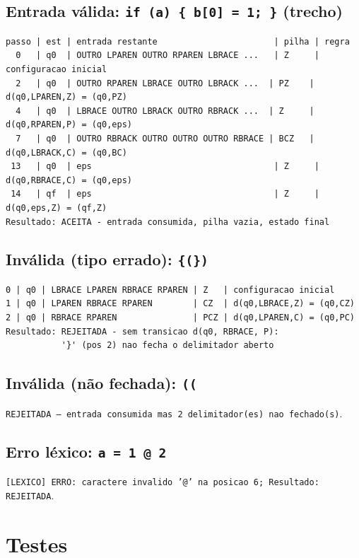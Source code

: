 \documentclass[12pt,a4paper]{article}
\begin{document}
\subsection*{Entrada válida: \texttt{if (a) \{ b[0] = 1; \}} (trecho)}
\begin{Verbatim}[fontsize=\scriptsize]
passo | est | entrada restante                       | pilha | regra
  0   | q0  | OUTRO LPAREN OUTRO RPAREN LBRACE ...   | Z     | configuracao inicial
  2   | q0  | OUTRO RPAREN LBRACE OUTRO LBRACK ...  | PZ    | d(q0,LPAREN,Z) = (q0,PZ)
  4   | q0  | LBRACE OUTRO LBRACK OUTRO RBRACK ...  | Z     | d(q0,RPAREN,P) = (q0,eps)
  7   | q0  | OUTRO RBRACK OUTRO OUTRO OUTRO RBRACE | BCZ   | d(q0,LBRACK,C) = (q0,BC)
 13   | q0  | eps                                    | Z     | d(q0,RBRACE,C) = (q0,eps)
 14   | qf  | eps                                    | Z     | d(q0,eps,Z) = (qf,Z)
Resultado: ACEITA - entrada consumida, pilha vazia, estado final
\end{Verbatim}

\subsection*{Inválida (tipo errado): \texttt{\{(\})}}
\begin{Verbatim}[fontsize=\scriptsize]
0 | q0 | LBRACE LPAREN RBRACE RPAREN | Z   | configuracao inicial
1 | q0 | LPAREN RBRACE RPAREN        | CZ  | d(q0,LBRACE,Z) = (q0,CZ)
2 | q0 | RBRACE RPAREN               | PCZ | d(q0,LPAREN,C) = (q0,PC)
Resultado: REJEITADA - sem transicao d(q0, RBRACE, P):
           '}' (pos 2) nao fecha o delimitador aberto
\end{Verbatim}

\subsection*{Inválida (não fechada): \texttt{((}}
\texttt{REJEITADA --- entrada consumida mas 2 delimitador(es) nao fechado(s)}.

\subsection*{Erro léxico: \texttt{a = 1 @ 2}}
\texttt{[LEXICO] ERRO: caractere invalido '@' na posicao 6; Resultado: REJEITADA}.

\section{Testes}
\end{document}
